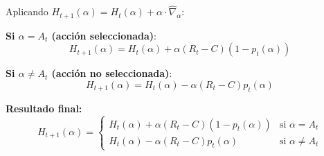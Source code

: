 \documentclass[12pt,a4paper]{article}
\begin{document}
Aplicando $H_{t+1}(\alpha) = H_t(\alpha) + \alpha \cdot \widehat{\nabla}_\alpha$:

\textbf{Si $\alpha = A_t$ (acción seleccionada)}:
$$H_{t+1}(\alpha) = H_t(\alpha) + \alpha(R_t - C)(1 - p_t(\alpha))$$

\textbf{Si $\alpha \neq A_t$ (acción no seleccionada)}:
$$H_{t+1}(\alpha) = H_t(\alpha) - \alpha(R_t - C)p_t(\alpha)$$

\textbf{Resultado final:}
$$H_{t+1}(\alpha) = \begin{cases}
H_t(\alpha) + \alpha(R_t - C)(1 - p_t(\alpha)) & \text{si } \alpha = A_t \\
H_t(\alpha) - \alpha(R_t - C)p_t(\alpha) & \text{si } \alpha \neq A_t
\end{cases}$$
\end{document}
